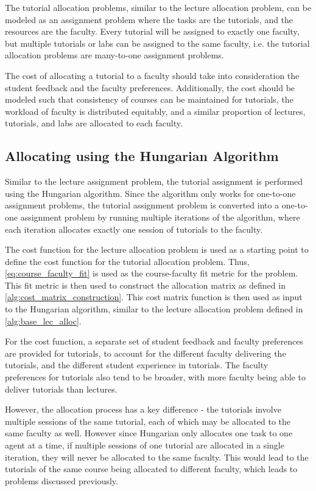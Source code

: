 The tutorial allocation problems, similar to the lecture allocation problem, can be modeled as an assignment problem where the tasks are the tutorials, and the resources are the faculty. Every tutorial will be assigned to exactly one faculty, but multiple tutorials or labs can be assigned to the same faculty, i.e. the tutorial allocation problems are many-to-one assignment problems.

The cost of allocating a tutorial to a faculty should take into consideration the student feedback and the faculty preferences. Additionally, the cost should be modeled such that consistency of courses can be maintained for tutorials, the workload of faculty is distributed equitably, and a similar proportion of lectures, tutorials, and labs are allocated to each faculty.

\subsection{Allocating using the Hungarian Algorithm}

Similar to the lecture assignment problem, the tutorial assignment is performed using the Hungarian algorithm. Since the algorithm only works for one-to-one assignment problems, the tutorial assignment problem is converted into a one-to-one assignment problem by running multiple iterations of the algorithm, where each iteration allocates exactly one session of tutorials to the faculty.

The cost function for the lecture allocation problem is used as a starting point to define the cost function for the tutorial allocation problem. Thus, \autoref{eq:course_faculty_fit} is used as the course-faculty fit metric for the problem. This fit metric is then used to construct the allocation matrix as defined in \autoref{alg:cost_matrix_construction}. This cost matrix function is then used as input to the Hungarian algorithm, similar to the lecture allocation problem defined in \autoref{alg:base_lec_alloc}.

For the cost function, a separate set of student feedback and faculty preferences are provided for tutorials, to account for the different faculty delivering the tutorials, and the different student experience in tutorials. The faculty preferences for tutorials also tend to be broader, with more faculty being able to deliver tutorials than lectures.

However, the allocation process has a key difference - the tutorials involve multiple sessions of the same tutorial, each of which may be allocated to the same faculty as well. However since Hungarian only allocates one task to one agent at a time, if multiple sessions of one tutorial are allocated in a single iteration, they will never be allocated to the same faculty. This would lead to the tutorials of the same course being allocated to different faculty, which leads to problems discussed previously.

